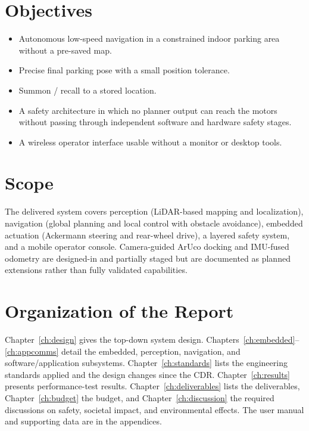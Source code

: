 \documentclass[12pt,a4paper]{report}
\begin{document}
\section{Objectives}

\begin{itemize}[leftmargin=1.4cm]
    \item Autonomous low-speed navigation in a constrained indoor parking area
          without a pre-saved map.
    \item Precise final parking pose with a small position tolerance.
    \item Summon / recall to a stored location.
    \item A safety architecture in which no planner output can reach the motors
          without passing through independent software and hardware safety stages.
    \item A wireless operator interface usable without a monitor or desktop tools.
\end{itemize}

\section{Scope}

The delivered system covers perception (LiDAR-based mapping and localization),
navigation (global planning and local control with obstacle avoidance), embedded
actuation (Ackermann steering and rear-wheel drive), a layered safety system, and
a mobile operator console. Camera-guided ArUco docking and IMU-fused odometry are
designed-in and partially staged but are documented as planned extensions rather
than fully validated capabilities.

\section{Organization of the Report}

Chapter~\ref{ch:design} gives the top-down system design. Chapters~\ref{ch:embedded}--\ref{ch:appcomms}
detail the embedded, perception, navigation, and software/application subsystems.
Chapter~\ref{ch:standards} lists the engineering standards applied and the design
changes since the CDR. Chapter~\ref{ch:results} presents performance-test results.
Chapter~\ref{ch:deliverables} lists the deliverables, Chapter~\ref{ch:budget} the
budget, and Chapter~\ref{ch:discussion} the required discussions on safety,
societal impact, and environmental effects. The user manual and supporting data
are in the appendices.
\end{document}
